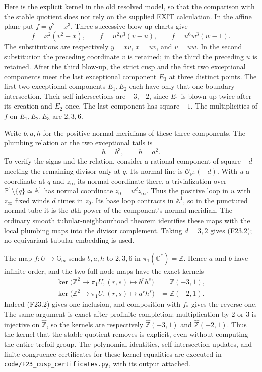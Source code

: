 Here is the explicit kernel in the old resolved model, so that the
comparison with the stable quotient does not rely on the supplied
EXIT calculation. In the affine plane put $f=y^2-x^3$. Three successive
blow-up charts give
\[
 f=x^2(v^2-x),\qquad
 f=u^2v^3(v-u),\qquad
 f=u^6w^3(w-1).
 \tag{F23.1}
\]
The substitutions are respectively $y=xv$, $x=uv$, and $v=uw$.
In the second substitution the preceding coordinate $v$ is retained;
in the third the preceding $u$ is retained. After the third blow-up,
the strict cusp and the first two exceptional components meet the
last exceptional component $E_3$ at three distinct points. The first
two exceptional components $E_1,E_2$ each have only that one boundary
intersection. Their self-intersections are $-3,-2$, since $E_1$ is
blown up twice after its creation and $E_2$ once. The last component
has square $-1$. The multiplicities of $f$ on $E_1,E_2,E_3$ are
$2,3,6$.

Write $b,a,h$ for the positive normal meridians of these three
components. The plumbing relation at the two exceptional tails is
\[
                         h=b^3,\qquad h=a^2.              \tag{F23.2}
\]
To verify the signs and the relation, consider a rational component
of square $-d$ meeting the remaining divisor only at $q$.
Its normal line is $\mathcal O_{\mathbb P^1}(-d)$. With $u$ a
coordinate at $q$ and $z_\infty$ its normal coordinate there, a
trivialization over $\mathbb P^1\setminus\{q\}\simeq\mathbb A^1$
has normal coordinate $z_0=u^d z_\infty$. Thus the positive loop in
$u$ with $z_\infty$ fixed winds $d$ times in $z_0$. Its base loop
contracts in $\mathbb A^1$, so in the punctured normal tube it is
the $d$th power of the component's normal meridian. The ordinary
smooth tubular-neighbourhood theorem identifies these maps with
the local plumbing maps into the divisor complement. Taking
$d=3,2$ gives (F23.2); no equivariant tubular embedding is used.

The map $f:U\to\mathbb G_m$ sends $b,a,h$ to $2,3,6$ in
$\pi_1(\mathbb C^*)=\mathbb Z$. Hence $a$ and $b$ have infinite
order, and the two full node maps have the exact kernels
\[
 \begin{split}
 \ker\bigl(\mathbb Z^2\longrightarrow\pi_1U,
                      (r,s)\longmapsto b^r h^s\bigr)
       &=\mathbb Z(-3,1),\\
 \ker\bigl(\mathbb Z^2\longrightarrow\pi_1U,
                      (r,s)\longmapsto a^r h^s\bigr)
       &=\mathbb Z(-2,1).
 \end{split}                                             \tag{F23.3}
\]
Indeed (F23.2) gives one inclusion, and composition with $f_*$
gives the reverse one. The same argument is exact after profinite
completion: multiplication by $2$ or $3$ is injective on
$\widehat{\mathbb Z}$, so the kernels are respectively
$\widehat{\mathbb Z}(-3,1)$ and
$\widehat{\mathbb Z}(-2,1)$. Thus the kernel that the stable
quotient removes is explicit, even without computing the entire
trefoil group. The polynomial identities, self-intersection updates,
and finite congruence certificates for these kernel equalities are
executed in \texttt{code/F23\_cusp\_certificates.py}, with its output
attached.

